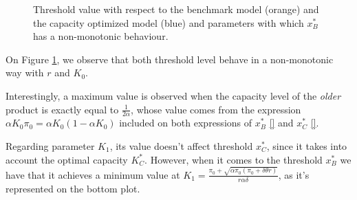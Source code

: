 \begin{figure}[!htb]
	\begin{subfigmatrix}{2}
	\end{subfigmatrix}
	\caption{Threshold value with respect to the benchmark model (orange) and the capacity optimized model (blue) and parameters with which  $x^*_B$ has a non-monotonic behaviour.}
	\label{fig:2_x1}
\end{figure}

On Figure \ref{fig:2_x1}, we observe that both threshold level behave in a non-monotonic way with $r$ and $K_0$.

Interestingly, a maximum value is observed when the capacity level of the \textit{older} product is exactly equal to $\frac{1}{2 \alpha}$, whose value comes from the expression $\alpha K_0 \pi_0=\alpha K_0 (1-\alpha K_0)$ included on both expressions of $x_B^*$ \eqref{} and $x^*_C$ \eqref{}.

Regarding parameter $K_1$, its value doesn't affect threshold $x^*_C$, since it takes into account the optimal capacity $K^*_C$. However, when it comes to the threshold $x^*_B$ we have that it achieves a minimum value at $K_1=\frac{\pi_0+\sqrt{\alpha \pi_0(\pi_0+\delta \theta r)}}{r\alpha \delta}$, as it's represented on the bottom plot.
	
